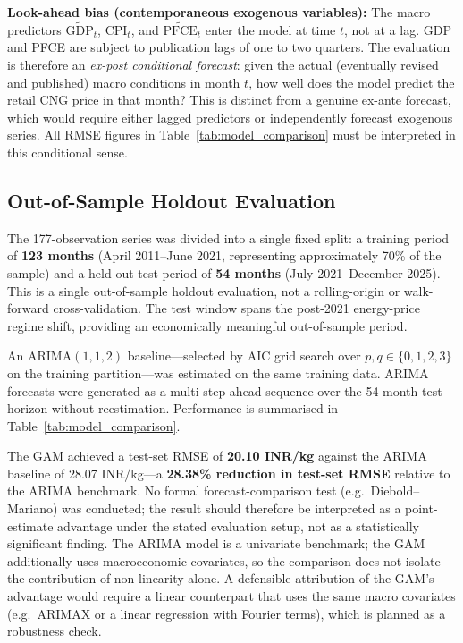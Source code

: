 \documentclass[11pt,a4paper]{article}
\begin{document}
\textbf{Look-ahead bias (contemporaneous exogenous variables):}  The macro
predictors $\widetilde{\mathrm{GDP}}_t$, $\mathrm{CPI}_t$, and
$\widetilde{\mathrm{PFCE}}_t$ enter the model at time $t$, not at a lag.
GDP and PFCE are subject to publication lags of one to two quarters.  The
evaluation is therefore an \emph{ex-post conditional forecast}: given the
actual (eventually revised and published) macro conditions in month $t$, how
well does the model predict the retail CNG price in that month?  This is
distinct from a genuine ex-ante forecast, which would require either lagged
predictors or independently forecast exogenous series.  All RMSE figures in
Table~\ref{tab:model_comparison} must be interpreted in this conditional sense.

\subsection{Out-of-Sample Holdout Evaluation}

The 177-observation series was divided into a single fixed split: a training
period of \textbf{123 months} (April 2011--June 2021, representing approximately
70\% of the sample) and a held-out test period of \textbf{54 months}
(July 2021--December 2025).  This is a single out-of-sample holdout evaluation,
not a rolling-origin or walk-forward cross-validation.  The test window spans the
post-2021 energy-price regime shift, providing an economically meaningful
out-of-sample period.

An ARIMA$(1,1,2)$ baseline---selected by AIC grid search over
$p, q \in \{0, 1, 2, 3\}$ on the training partition---was estimated on the
same training data.  ARIMA forecasts were generated as a multi-step-ahead
sequence over the 54-month test horizon without reestimation.  Performance is
summarised in Table~\ref{tab:model_comparison}.



The GAM achieved a test-set RMSE of \textbf{20.10 INR/kg} against the ARIMA
baseline of 28.07 INR/kg---a \textbf{28.38\% reduction in test-set RMSE}
relative to the ARIMA benchmark.  No formal forecast-comparison test
(e.g.\ Diebold--Mariano) was conducted; the result should therefore be
interpreted as a point-estimate advantage under the stated evaluation setup,
not as a statistically significant finding.  The ARIMA model is a univariate
benchmark; the GAM additionally uses macroeconomic covariates, so the
comparison does not isolate the contribution of non-linearity alone.  A
defensible attribution of the GAM's advantage would require a linear
counterpart that uses the same macro covariates (e.g.\ ARIMAX or a linear
regression with Fourier terms), which is planned as a robustness check.
\end{document}
